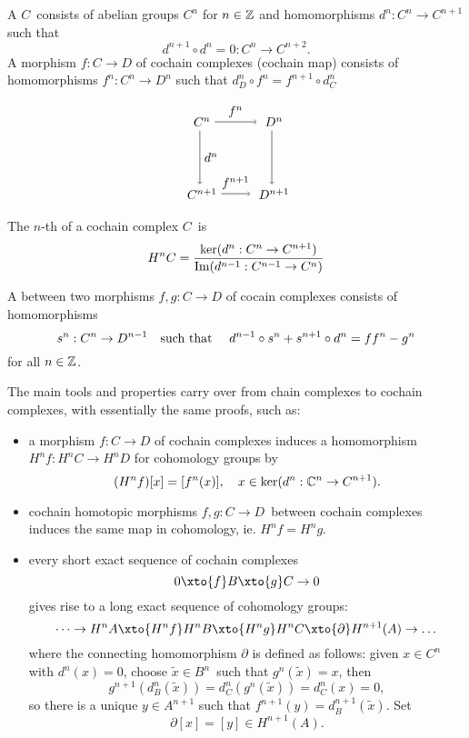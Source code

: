 \documentclass[a4paper,11pt,english]{article}
\begin{document}
\begin{defn}
A  $C$ consists of abelian groups $C^n$ for $n\in\mathbb{Z}$
and homomorphisms $d^n : C^n \to C^{n+1}$ such that 
\[ d^{n+1} \circ d^n = 0 : C^n \to C^{n+2}.  \]
A morphism $f : C \to D$ of cochain complexes (cochain map) consists of
homomorphisms $f^n: C^n \to D^n$ such that $d_D^n \circ f^n = f^{n+1} \circ
d_C^n$ 



\[ \diagSquare{f^n}{d^n}{}{f^{n+1}}{C^n}{D^n}{C^{n+1}}{D^{n+1}}   \]


The $n$-th  of a cochain complex $C$ is
\[ H^nC = \frac{\ker(d^n : C^n \to C^{n+1})}{\operatorname{Im}(d^{n-1} : C^{n-1} \to C^n)} \]

A  between two morphisms $f,g: C \to D$ of cocain
complexes consists of homomorphisms 
\[ s^n: C^n \to D^{n-1} \quad\text{such that }\quad d^{n-1}\circ s^n + s^{n+1} \circ d^n =f f^n - g^n  \] 
for all $n\in\mathbb{Z}$.

The main tools and properties carry over from chain complexes to cochain
complexes, with essentially the same proofs, such as:

\begin{itemize}
\item a morphism $f: C \to D$ of cochain complexes induces a homomorphism $H^n f
: H^n C \to H^n D$ for cohomology groups by
\[ (H^n f) [x] = [f^n(x)], \quad x \in \ker(d^n : \mathbb{C}^n \to C^{n+1}). \]
%
\item cochain homotopic morphisms $f,g : C \to D$ between cochain complexes
induces the same map in cohomology, ie. $H^n f = H^n g$.
%
\item every short exact sequence of cochain complexes 
\[ 0 \xto{f} B \xto{g} C \to 0 \]
gives rise to a long exact sequence of cohomology groups:
\[ \dots \to H^n A \xto{H^n f} H^n B \xto{H^n g} H^n C \xto{\partial} H^{n+1}(A)
\to \dots \]
where the connecting homomorphism $\partial$ is defined as follows: given $x\in
C^n$ with $d^n(x) = 0$, choose $\tilde{x} \in B^n$ such that $g^n(\tilde{x}) =
x$, then 
\[ g^{n+1} (d_B^n(\tilde{x})) = d_C^n(g^n(\tilde{x})) = d_C^n(x) = 0, \]
so there is a unique $y\in A^{n+1}$ such that $f^{n+1}(y) =
d_B^{n+1}(\tilde{x})$. Set 
\[ \partial [x] = [y] \in H^{n+1}(A). \]
\end{itemize}

\end{defn}
\end{document}

